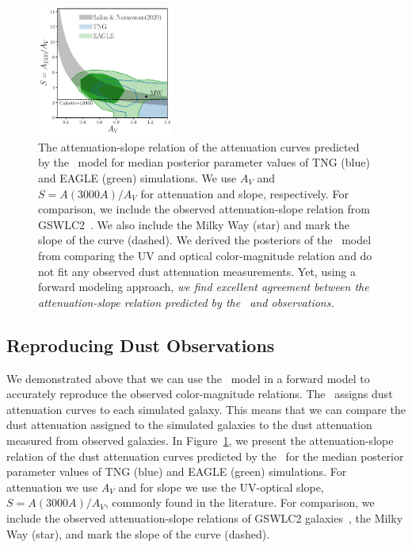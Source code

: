 \begin{figure}
\begin{center}
    \includegraphics[width=0.4\textwidth]{figs/abc_slope_AV_all.pdf}
    \caption{\label{fig:slope}
    The attenuation-slope relation of the attenuation curves predicted by the
    \eda~model for median posterior parameter values of TNG (blue) and EAGLE
    (green) simulations. We use $A_V$ and $S = A(3000A)/A_V$ for attenuation
    and slope, respectively. For comparison, we include the observed 
    attenuation-slope relation from GSWLC2~\citep{salim2020}. We also include 
    the Milky Way (star) and mark the slope of the \cite{calzetti2001} curve
    (dashed). We derived the posteriors of the \eda~model from comparing the
    UV and optical color-magnitude relation and do not fit any observed dust
    attenuation measurements. Yet, using a forward modeling approach, \emph{we find 
    excellent agreement between the attenuation-slope relation predicted by
    the \eda~and observations.}
    }
\end{center}
\end{figure}

\subsection{Reproducing Dust Observations} 
We demonstrated above that we can use the \eda~model in a forward model to
accurately reproduce the observed color-magnitude relations. The \eda~assigns dust attenuation curves to each simulated galaxy. This
means that we can compare the dust attenuation assigned to the simulated
galaxies to the dust attenuation measured from 
observed galaxies. In Figure~\ref{fig:slope}, we present the attenuation-slope 
relation of the dust attenuation curves predicted by the \eda~for the median posterior parameter 
values of TNG (blue) and EAGLE (green) simulations. For attenuation we use
$A_V$ and for slope we use the UV-optical slope, $S = A(3000A)/A_V$, commonly
found in the literature. For comparison, we include the observed
attenuation-slope relations of GSWLC2 galaxies~\citep[grey;][]{salim2020}, the
Milky Way (star), and mark the slope of the \cite{calzetti2001} curve (dashed). 

